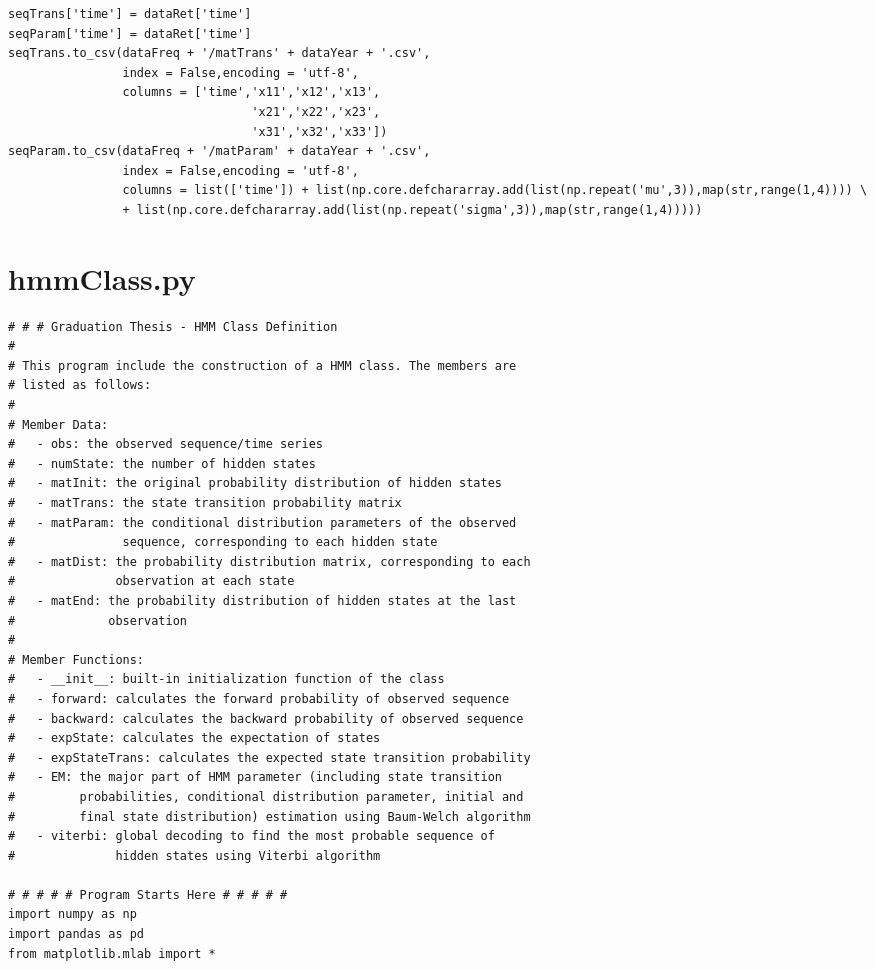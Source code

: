 \begin{spacing}{1.2}
\begin{lstlisting}
seqTrans['time'] = dataRet['time']
seqParam['time'] = dataRet['time']
seqTrans.to_csv(dataFreq + '/matTrans' + dataYear + '.csv',
                index = False,encoding = 'utf-8',
                columns = ['time','x11','x12','x13',
                                  'x21','x22','x23',
                                  'x31','x32','x33'])
seqParam.to_csv(dataFreq + '/matParam' + dataYear + '.csv',
                index = False,encoding = 'utf-8',
                columns = list(['time']) + list(np.core.defchararray.add(list(np.repeat('mu',3)),map(str,range(1,4)))) \
                + list(np.core.defchararray.add(list(np.repeat('sigma',3)),map(str,range(1,4)))))
\end{lstlisting}
\newpage

\section{hmmClass.py}
\label{sec:code:class}
\begin{lstlisting}
# # # Graduation Thesis - HMM Class Definition
#
# This program include the construction of a HMM class. The members are 
# listed as follows:
#
# Member Data:
#   - obs: the observed sequence/time series
#   - numState: the number of hidden states
#   - matInit: the original probability distribution of hidden states
#   - matTrans: the state transition probability matrix
#   - matParam: the conditional distribution parameters of the observed 
#               sequence, corresponding to each hidden state
#   - matDist: the probability distribution matrix, corresponding to each 
#              observation at each state
#   - matEnd: the probability distribution of hidden states at the last 
#             observation
#
# Member Functions:
#   - __init__: built-in initialization function of the class
#   - forward: calculates the forward probability of observed sequence
#   - backward: calculates the backward probability of observed sequence
#   - expState: calculates the expectation of states
#   - expStateTrans: calculates the expected state transition probability
#   - EM: the major part of HMM parameter (including state transition 
#         probabilities, conditional distribution parameter, initial and 
#         final state distribution) estimation using Baum-Welch algorithm
#   - viterbi: global decoding to find the most probable sequence of 
#              hidden states using Viterbi algorithm

# # # # # Program Starts Here # # # # #
import numpy as np
import pandas as pd
from matplotlib.mlab import *


\end{lstlisting}
\end{spacing}
